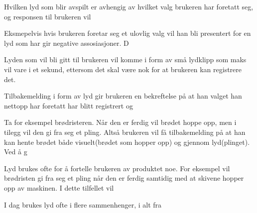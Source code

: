Hvilken lyd som blir avspilt er avhengig av hvilket valg brukeren har foretatt seg, og responsen til brukeren vil 

Eksmepelvis hvis brukeren foretar seg et ulovlig valg vil han bli presentert for en lyd som har gir negative assosiasjoner.  D

Lyden som vil bli gitt til brukeren vil komme i form av små lydklipp som maks vil vare i et sekund,  ettersom det skal være nok for at brukeren kan registrere det. 

 Tilbakemelding i form av lyd gir brukeren en bekreftelse på at han valget han nettopp har foretatt har blitt registrert og 





Ta for eksempel brødristeren. Når den er ferdig vil brødet hoppe opp, men i tilegg vil den gi fra seg et pling. Altså brukeren vil få tilbakemelding på at han kan hente brødet både visuelt(brødet som hopper opp) og gjennom lyd(plinget). Ved å g

Lyd brukes ofte for å fortelle brukeren av produktet noe. For eksempel vil brødristen gi fra seg et pling når den er ferdig samtidig med at skivene hopper opp av maskinen. I dette tilfellet vil 


I dag brukes lyd ofte i flere sammenhenger, i alt fra